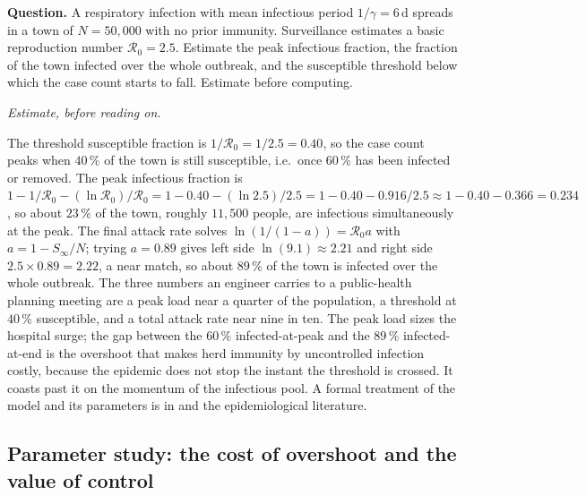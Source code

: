 \begin{estimation}
\textbf{Question.} A respiratory infection with mean infectious period
$1/\gamma = 6\,\si{\day}$ spreads in a town of $N = 50{,}000$ with no
prior immunity. Surveillance estimates a basic reproduction number
$\mathcal{R}_{0} = 2.5$. Estimate the peak infectious fraction, the
fraction of the town infected over the whole outbreak, and the
susceptible threshold below which the case count starts to fall.
Estimate before computing.

\smallskip
\textit{Estimate, before reading on.}

\smallskip
The threshold susceptible fraction is $1/\mathcal{R}_{0} = 1/2.5 =
0.40$, so the case count peaks when $40\,\%$ of the town is still
susceptible, i.e.\ once $60\,\%$ has been infected or removed. The peak
infectious fraction is $1 - 1/\mathcal{R}_{0} - (\ln\mathcal{R}_{0})/
\mathcal{R}_{0} = 1 - 0.40 - (\ln 2.5)/2.5 = 1 - 0.40 - 0.916/2.5
\approx 1 - 0.40 - 0.366 = 0.234$, so about $23\,\%$ of the town,
roughly $11{,}500$ people, are infectious simultaneously at the peak.
The final attack rate solves $\ln(1/(1 - a)) = \mathcal{R}_{0} a$ with
$a = 1 - S_{\infty}/N$; trying $a = 0.89$ gives left side $\ln(9.1)
\approx 2.21$ and right side $2.5 \times 0.89 = 2.22$, a near match, so
about $89\,\%$ of the town is infected over the whole outbreak. The
three numbers an engineer carries to a public-health planning meeting
are a peak load near a quarter of the population, a threshold at
$40\,\%$ susceptible, and a total attack rate near nine in ten. The
peak load sizes the hospital surge; the gap between the $60\,\%$
infected-at-peak and the $89\,\%$ infected-at-end is the overshoot
that makes herd immunity by uncontrolled infection costly, because the
epidemic does not stop the instant the threshold is crossed. It coasts
past it on the momentum of the infectious pool. A formal treatment of
the model and its parameters is in
\textcite{text:v2ch07-strogatz-nonlinear} and the epidemiological
literature.
\end{estimation}

\subsection{Parameter study: the cost of overshoot and the value of control}

